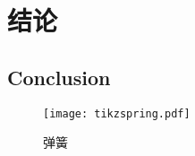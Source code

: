 \chapter{结论}
\section{Conclusion}
\lipsum[87]

\begin{figure}
\centerline{\texttt{[image: tikzspring.pdf]}}
\caption{弹簧}
\label{fig:spring}
\end{figure}